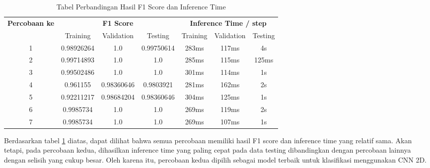 \begin{table}[H]
    \centering
    \begin{tabular}{|c|c|c|c|c|c|c|}
        \hline
        \textbf{Percobaan ke} & \multicolumn{3}{c|}{\textbf{F1 Score}} & \multicolumn{3}{c|}{\textbf{Inference Time / step}}                                                \\ \cline{2-7}
                              & Training                               & Validation                                          & Testing    & Training & Validation & Testing \\ \hline
        1                     & 0.98926264                             & 1.0                                                 & 0.99750614 & 283ms    & 117ms      & 4s      \\ \hline
        2                     & 0.99714893                             & 1.0                                                 & 1.0        & 285ms    & 115ms      & 125ms   \\ \hline
        3                     & 0.99502486                             & 1.0                                                 & 1.0        & 301ms    & 114ms      & 1s      \\ \hline
        4                     & 0.961155                               & 0.98360646                                          & 0.9803921  & 281ms    & 162ms      & 2s      \\ \hline
        5                     & 0.92211217                             & 0.98684204                                          & 0.98360646 & 304ms    & 125ms      & 1s      \\ \hline
        6                     & 0.9985734                              & 1.0                                                 & 1.0        & 269ms    & 119ms      & 2s      \\ \hline
        7                     & 0.9985734                              & 1.0                                                 & 1.0        & 269ms    & 107ms      & 1s      \\ \hline
    \end{tabular}
    \caption{Tabel Perbandingan Hasil F1 Score dan Inference Time}
    \label{tab:perbaningancnn}
\end{table}

Berdasarkan tabel \ref{tab:perbaningancnn} diatas, dapat dilihat bahwa semua percobaan memiliki hasil F1 score dan inference time yang relatif sama. Akan tetapi, pada percobaan kedua, dihasilkan inference time yang paling cepat pada data testing dibandingkan dengan percobaan lainnya dengan selisih yang cukup besar. Oleh karena itu, percobaan kedua dipilih sebagai model terbaik untuk klasifikasi menggunakan CNN 2D.

